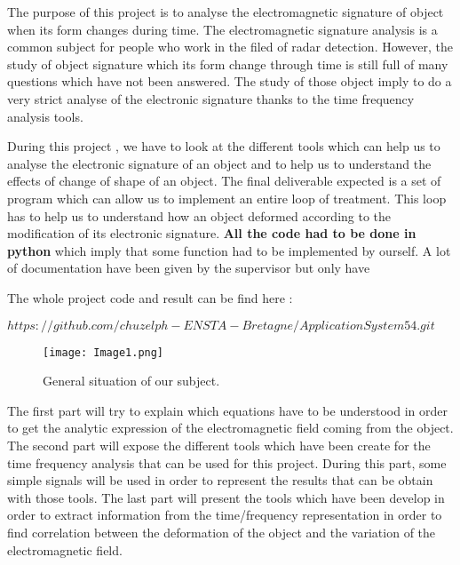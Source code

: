 The purpose of this project is to analyse the electromagnetic signature of object when its form changes during time. The electromagnetic signature analysis is a common subject for people who work in the filed of radar detection. However, the study of object signature which its form change through time is still full of many questions which have not been answered. The study of those object imply to do a very strict analyse of the electronic signature thanks to the time frequency analysis tools.

\bigskip

During this project \cite{Analysis}, we have to look at the different tools which can help us to analyse the electronic signature of an object and to help us to understand the effects of change of shape of an object. The final deliverable expected is a set of program which can allow us to implement an entire loop of treatment. This loop has to help us to understand how an object deformed according to the modification of its electronic signature. \textbf{All the code had to be done in python} which imply that some function had to be implemented by ourself. A lot of documentation have been given by the supervisor  but only have

\bigskip

The whole project code and result can be find here :

$https://github.com/chuzelph-ENSTA-Bretagne/ApplicationSystem54.git$


\begin{figure}[H]
\centering
    \texttt{[image: Image1.png]}
    \caption{General situation of our subject.}
    \label{fig:Image1}
\end{figure}

\bigskip

The first part will try to explain which equations have to be understood in order to get the analytic expression of the electromagnetic field coming from the object.
The second part will expose the different tools which have been create for the time frequency analysis that can be used for this project. During this part, some simple signals will be used in order to represent the results that can be obtain with those tools.
The last part will present the tools which have been develop in order to extract information from the time/frequency representation in order to find correlation between the deformation of the object and the variation of the electromagnetic field.

